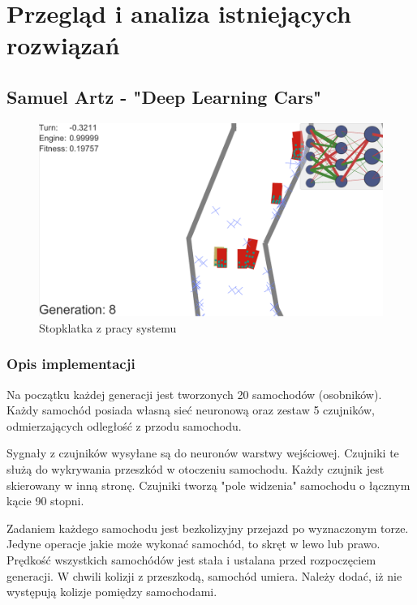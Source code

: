 \chapter{Przegląd i analiza istniejących rozwiązań}
\section{
	Samuel Artz - "Deep Learning Cars"
	\cite{artz:deepLearningCars:blog}
	\cite{artz:deepLearningCars:github}
}

\begin{figure}[h]
\begin{center}
\includegraphics[width=16cm]{resources/figures/samuelArtzDeepCars.png}
\caption{Stopklatka z pracy systemu}
\end{center}
\end{figure}
\label{SamuelArtzDeepLearningCars}

\subsection{Opis implementacji}
Na początku każdej generacji jest tworzonych 20 samochodów (osobników). \\
Każdy samochód posiada własną sieć neuronową oraz zestaw 5 czujników, odmierzających odległość z przodu samochodu.

Sygnały z czujników wysyłane są do neuronów warstwy wejściowej.
Czujniki te służą do wykrywania przeszkód w otoczeniu samochodu.
Każdy czujnik jest skierowany w inną stronę.
Czujniki tworzą "pole widzenia" samochodu o łącznym kącie 90 stopni.

Zadaniem każdego samochodu jest bezkolizyjny przejazd po wyznaczonym torze.
Jedyne operacje jakie może wykonać samochód, to skręt w lewo lub prawo.
Prędkość wszystkich samochódów jest stała i ustalana przed rozpoczęciem generacji.
W chwili kolizji z przeszkodą, samochód umiera.
Należy dodać, iż nie występują kolizje pomiędzy samochodami.

